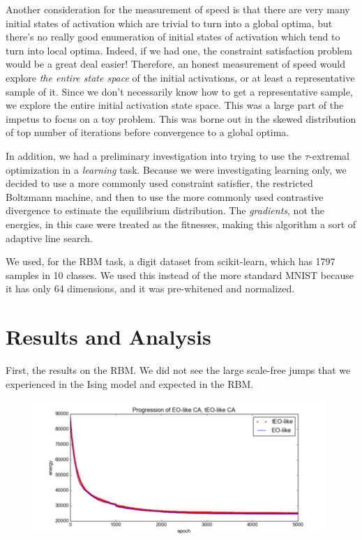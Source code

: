 \documentclass[12pt]{article}
\begin{document}
Another consideration for the measurement of speed is that there are very many initial states of activation which are trivial to turn into a global optima, but there's no really good enumeration of initial states of activation which tend to turn into local optima. Indeed, if we had one, the constraint satisfaction problem would be a great deal easier! Therefore, an honest measurement of speed would explore \emph{the entire state space} of the initial activations, or at least a representative sample of it. Since we don't necessarily know how to get a representative sample, we explore the entire initial activation state space. This was a large part of the impetus to focus on a toy problem. This was borne out in the skewed distribution of top number of iterations before convergence to a global optima.

In addition, we had a preliminary investigation into trying to use the $\tau$-extremal optimization in a \emph{learning} task. Because we were investigating learning only, we decided to use a more commonly used constraint satisfier, the restricted Boltzmann machine, and then to use the more commonly used contrastive divergence to estimate the equilibrium distribution. The \emph{gradients}, not the energies, in this case were treated as the fitnesses, making this algorithm a sort of adaptive line search.

We used, for the RBM task, a digit dataset from scikit-learn, which has 1797 samples in 10 classes. We used this instead of the more standard MNIST because it has only 64 dimensions, and it was pre-whitened and normalized. %

\section{Results and Analysis}
First, the results on the RBM. We did not see the large scale-free jumps that we experienced in the Ising model and expected in the RBM.


\begin{figure}
  \includegraphics{eo_rbm_unzoomed}
\end{figure}
\end{document}
